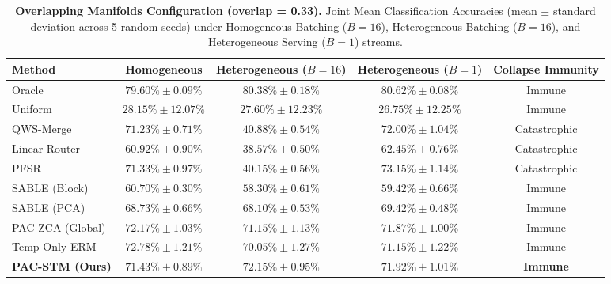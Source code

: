 \begin{table}[t]
\caption{\textbf{Overlapping Manifolds Configuration (overlap = 0.33).} Joint Mean Classification Accuracies (mean $\pm$ standard deviation across 5 random seeds) under Homogeneous Batching ($B=16$), Heterogeneous Batching ($B=16$), and Heterogeneous Serving ($B=1$) streams.}
\label{tab:overlapping}
\vskip 0.15in
\begin{center}
\begin{small}
\begin{sc}
\begin{tabular}{lcccc}
\toprule
Method & Homogeneous & Heterogeneous ($B=16$) & Heterogeneous ($B=1$) & Collapse Immunity \\
\midrule
\textnormal{Oracle} & $79.60\% \pm 0.09\%$ & $80.38\% \pm 0.18\%$ & $80.62\% \pm 0.08\%$ & \textnormal{Immune} \\
\textnormal{Uniform} & $28.15\% \pm 12.07\%$ & $27.60\% \pm 12.23\%$ & $26.75\% \pm 12.25\%$ & \textnormal{Immune} \\
\midrule
\textnormal{QWS-Merge} & $71.23\% \pm 0.71\%$ & $40.88\% \pm 0.54\%$ & $72.00\% \pm 1.04\%$ & \textnormal{Catastrophic} \\
\textnormal{Linear Router} & $60.92\% \pm 0.90\%$ & $38.57\% \pm 0.50\%$ & $62.45\% \pm 0.76\%$ & \textnormal{Catastrophic} \\
\textnormal{PFSR} & $71.33\% \pm 0.97\%$ & $40.15\% \pm 0.56\%$ & $73.15\% \pm 1.14\%$ & \textnormal{Catastrophic} \\
\midrule
\textnormal{SABLE (Block)} & $60.70\% \pm 0.30\%$ & $58.30\% \pm 0.61\%$ & $59.42\% \pm 0.66\%$ & \textnormal{Immune} \\
\textnormal{SABLE (PCA)} & $68.73\% \pm 0.66\%$ & $68.10\% \pm 0.53\%$ & $69.42\% \pm 0.48\%$ & \textnormal{Immune} \\
\textnormal{PAC-ZCA (Global)} & $72.17\% \pm 1.03\%$ & $71.15\% \pm 1.13\%$ & $71.87\% \pm 1.00\%$ & \textnormal{Immune} \\
\textnormal{Temp-Only ERM} & $72.78\% \pm 1.21\%$ & $70.05\% \pm 1.27\%$ & $71.15\% \pm 1.22\%$ & \textnormal{Immune} \\
\midrule
\textnormal{\textbf{PAC-STM (Ours)}} & $\mathbf{71.43\% \pm 0.89\%}$ & $\mathbf{72.15\% \pm 0.95\%}$ & $\mathbf{71.92\% \pm 1.01\%}$ & \textnormal{\textbf{Immune}} \\
\bottomrule
\end{tabular}
\end{sc}
\end{small}
\end{center}
\vskip -0.1in
\end{table}

